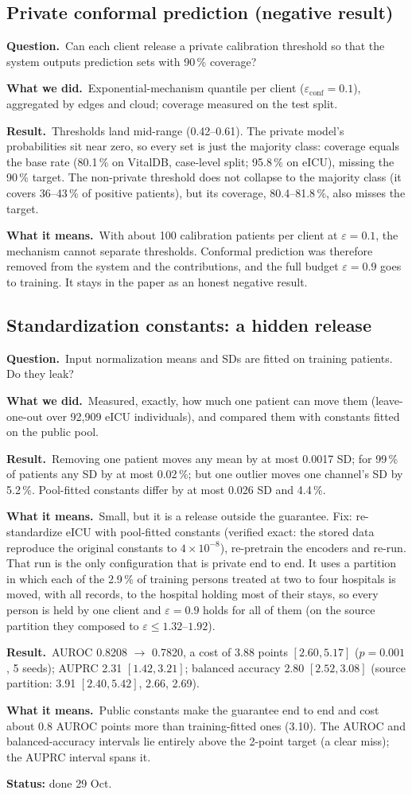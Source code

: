 \documentclass[11pt,a4paper]{article}
\newenvironment{experiment}[2]{\subsection{#1}\label{#2}}{}
\newcommand{\Q}{\par\textbf{Question.}\ }
\newcommand{\D}{\par\textbf{What we did.}\ }
\newcommand{\R}{\par\textbf{Result.}\ }
\newcommand{\M}{\par\textbf{What it means.}\ }
\newcommand{\status}[1]{\par\textbf{Status:} #1}
\begin{document}
\begin{experiment}{Private conformal prediction (negative result)}{exp:conf}
\Q Can each client release a private calibration threshold so that the
system outputs prediction sets with 90\,\% coverage?
\D Exponential-mechanism quantile per client ($\varepsilon_{\text{conf}} = 0.1$),
aggregated by edges and cloud; coverage measured on the test split.
\R Thresholds land mid-range (0.42--0.61). The private model's probabilities sit
near zero, so every set is just the majority class: coverage equals the base
rate (80.1\,\% on VitalDB, case-level split; 95.8\,\% on eICU), missing
the 90\,\% target. The non-private threshold does not collapse to the
majority class (it covers 36--43\,\% of positive patients), but its coverage,
80.4--81.8\,\%, also misses the target.
\M With about 100 calibration patients per client at $\varepsilon = 0.1$, the
mechanism cannot separate thresholds. Conformal prediction was therefore
removed from the system and the contributions, and the full budget
$\varepsilon = 0.9$ goes to training. It stays in the paper as an honest
negative result.
\end{experiment}

\begin{experiment}{Standardization constants: a hidden release}{exp:std}
\Q Input normalization means and SDs are fitted on training patients. Do they
leak?
\D Measured, exactly, how much one patient can move them (leave-one-out over
92{,}909 eICU individuals), and compared them with constants fitted on the
public pool.
\R Removing one patient moves any mean by at most 0.0017 SD; for 99\,\% of
patients any SD by at most 0.02\,\%; but one outlier moves one channel's SD by
5.2\,\%. Pool-fitted constants differ by at most 0.026 SD and 4.4\,\%.
\M Small, but it is a release outside the guarantee. Fix: re-standardize
eICU with pool-fitted constants (verified exact: the stored data reproduce the
original constants to $4\times10^{-8}$), re-pretrain the encoders and re-run.
That run is the only configuration that is private end to end. It uses a
partition in which each of the 2.9\,\% of training persons treated at two to
four hospitals is moved, with all records, to the hospital holding most of
their stays, so every person is held by one client and $\varepsilon = 0.9$
holds for all of them (on the source partition they composed to
$\varepsilon \le 1.32$--$1.92$).
\R AUROC 0.8208 $\rightarrow$ 0.7820, a cost of 3.88 points $[2.60, 5.17]$
($p = 0.001$, 5 seeds); AUPRC 2.31 $[1.42, 3.21]$; balanced accuracy 2.80
$[2.52, 3.08]$ (source partition: 3.91 $[2.40, 5.42]$, 2.66, 2.69).
\M Public constants make the guarantee end to end and cost about 0.8 AUROC
points more than training-fitted ones (3.10). The AUROC and balanced-accuracy
intervals lie entirely above the 2-point target (a clear miss); the AUPRC
interval spans it.
\status{done 29 Oct.}
\end{experiment}
\end{document}
